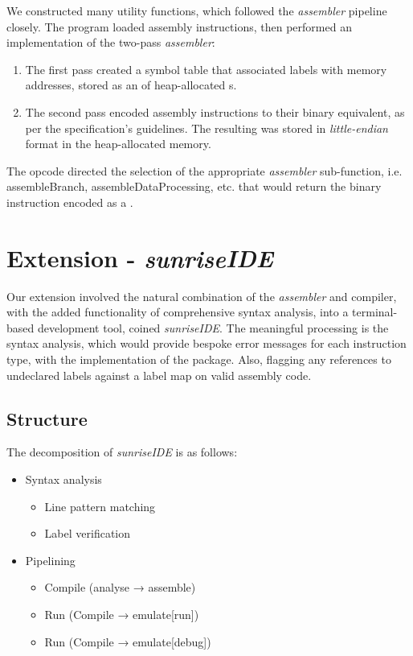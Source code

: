 \documentclass[11pt]{article}
\begin{document}
We constructed many utility functions, which followed the {\it assembler} pipeline closely. The program loaded assembly instructions, then performed an implementation of the two-pass {\it assembler}: 
\begin{enumerate}
    \item The first pass created a symbol table that associated labels with memory addresses, stored as an  of heap-allocated s.
    \item The second pass encoded assembly instructions to their binary equivalent, as per the specification's guidelines. The resulting  was stored in {\it little-endian} format in the heap-allocated memory.
\end{enumerate}

The opcode directed the selection of the appropriate {\it assembler} sub-function, i.e. assembleBranch, assembleDataProcessing, etc. that would return the binary instruction encoded as a .

\section{Extension - {\it sunriseIDE}}
Our extension involved the natural combination of the {\it assembler} and compiler, with the added functionality of comprehensive syntax analysis, into a terminal-based development tool, coined {\it sunriseIDE}. The meaningful processing is the syntax analysis, which would provide bespoke error messages for each instruction type, with the implementation of the  package. Also, flagging any references to undeclared labels against a label map on valid assembly code.

\subsection{Structure}
The decomposition of {\it sunriseIDE} is as follows:

\begin{itemize}
\item Syntax analysis
    \begin{itemize}
        \item Line pattern matching
        \item Label verification
    \end{itemize}
\item Pipelining
    \begin{itemize}
        \item Compile (analyse → assemble)
        \item Run (Compile → emulate[run])
        \item Run (Compile → emulate[debug])
    \end{itemize}
\end{itemize}
\end{document}
